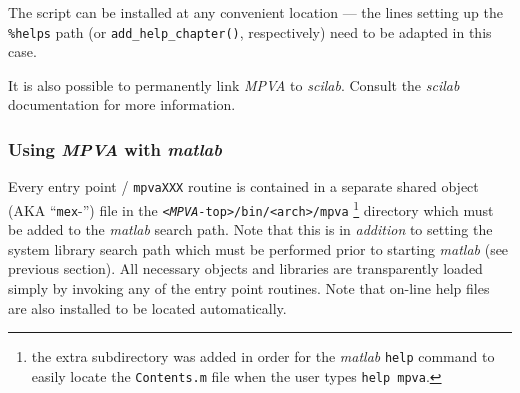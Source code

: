 \documentclass{article}
\newcommand{\sca}{\ita{MPVA}}
\newcommand{\scilab}{\ita{scilab}}
\newcommand{\matlab}{\ita{matlab}}
\newcommand{\com}[1]{{\tt #1}}
\newcommand{\ita}[1]{\emph{#1}}
\begin{document}
The script can be installed at any convenient location --- the lines
setting up the \com{\%helps} path (or \com{add\_help\_chapter()}, respectively)
need to be adapted in this case.

It is also possible to permanently link \sca{} to \scilab{}. Consult
the \scilab{} documentation for more information.

\subsubsection{Using \sca{} with \matlab}
Every entry point / \com{mpvaXXX} routine 
is contained in a separate
shared object (AKA ``\com{mex}-'') file in the \com{<\sca-top>/bin/<arch>/mpva}%
\footnote{
the extra subdirectory was added in order for the \matlab{} \com{help} command
to easily locate the \com{Contents.m} file when the user types \com{help mpva}.
} directory
which must be added to the \matlab{} search path.
Note that this is in \ita{addition}
to setting the system library search path which must be performed prior
to starting \matlab{} (see previous section).
All necessary objects and libraries are transparently loaded simply
by invoking any of the entry point routines. Note that on-line help
files are also installed to be located automatically.
\end{document}
